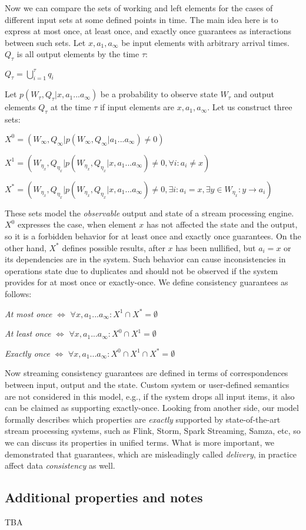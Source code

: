 \documentclass[sigconf]{acmart}
\theoremstyle{remark}
\begin{document}
Now we can compare the sets of working and left elements for the cases of different input sets at some defined points in time. The main idea here is to express at most once, at least once, and exactly once guarantees as interactions between such sets. Let $x,a_1,a_\infty$ be input elements with arbitrary arrival times. $Q_\tau$ is all output elements by the time $\tau$:

$Q_\tau=\bigcup\limits_{i=1}^{\tau}{q_i}$

Let $p(W_\tau,Q_\tau|x,a_1...a_\infty)$ be a probability to observe state $W_\tau$ and output elements $Q_\tau$ at the time $\tau$ if input elements are $x,a_1,a_\infty$. Let us construct three sets:

$X^0=(W_\infty,Q_\infty|p(W_\infty,Q_\infty|a_1...a_\infty)\neq{0})$

$X^1=(W_{\eta_{x}},Q_{\eta_{x}}|p(W_{\eta_{x}},Q_{\eta_{x}}|x,a_1...a_\infty)\neq{0},\forall{i}:{a_i}\neq{x})$

$X^{*}=(W_{\eta_{x}},Q_{\eta_{x}}|p(W_{\eta_{x}},Q_{\eta_{x}}|x,a_1...a_\infty)\neq{0},\exists{i}:{a_i={x}},\exists{y\in{W_{\eta_{x}}}}:y\to{a_i})$

These sets model the {\em observable} output and state of a stream processing engine. $X^0$ expresses the case, when element $x$ has not affected the state and the output, so it is a forbidden behavior for at least once and exactly once guarantees. On the other hand, $X^{*}$ defines possible results, after $x$ has been nullified, but $a_i=x$ or its dependencies are in the system. Such behavior can cause inconsistencies in operations state due to duplicates and should not be observed if the system provides for at most once or exactly-once. We define consistency guarantees as follows: 

{\em At most once} $\iff$ $\forall{x,a_1...a_\infty}:X^{1}\cap{X^{*}}=\emptyset$

{\em At least once} $\iff$ $\forall{x,a_1...a_\infty}:X^{0}\cap{X^{1}}=\emptyset$

{\em Exactly once} $\iff$ $\forall{x,a_1...a_\infty}:X^{0}\cap{X^{1}}\cap{X^{*}}=\emptyset$

Now streaming consistency guarantees are defined in terms of correspondences between input, output and the state. Custom system or user-defined semantics are not considered in this model, e.g., if the system drops all input items, it also can be claimed as supporting exactly-once. Looking from another side, our model formally describes which properties are {\em exactly} supported by state-of-the-art stream processing systems, such as Flink, Storm, Spark Streaming, Samza, etc, so we can discuss its properties in unified terms. What is more important, we demonstrated that guarantees, which are misleadingly called {\em delivery}, in practice affect data {\em consistency} as well.

\subsection{Additional properties and notes}
 
 TBA



\end{document}
